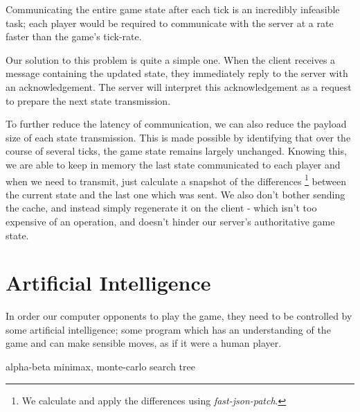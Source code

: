 \documentclass{standalone}
\begin{document}
		Communicating the entire game state after each tick is an incredibly infeasible task; each player would be required to communicate with the server at a rate faster than the game's tick-rate.

		Our solution to this problem is quite a simple one. When the client receives a message containing the updated state, they immediately reply to the server with an acknowledgement. The server will interpret this acknowledgement as a request to prepare the next state transmission.

		To further reduce the latency of communication, we can also reduce the payload size of each state transmission. This is made possible by identifying that over the course of several ticks, the game state remains largely unchanged. Knowing this, we are able to keep in memory the last state communicated to each player and when we need to transmit, just calculate a snapshot of the differences \footnote{We calculate and apply the differences using \emph{fast-json-patch}\parencite{FastJsonPatch}.} between the current state and the last one which was sent. We also don't bother sending the cache, and instead simply regenerate it on the client - which isn't too expensive of an operation, and doesn't hinder our server's authoritative game state.

	\section{Artificial Intelligence}
		In order our computer opponents to play the game, they need to be controlled by some artificial intelligence; some program which has an understanding of the game and can make sensible moves, as if it were a human player.

		
		alpha-beta minimax, monte-carlo search tree
\end{document}
